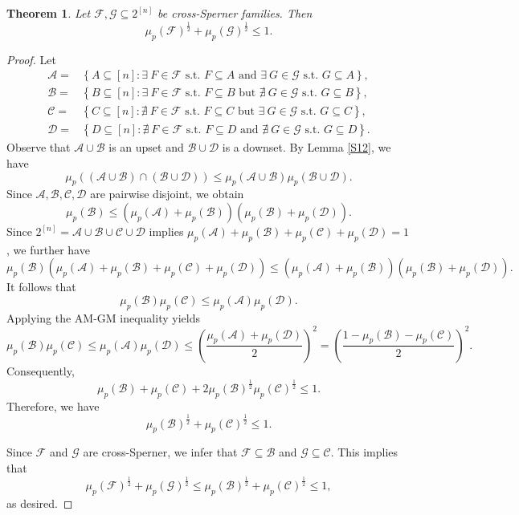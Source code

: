 \documentclass[11pt]{article}
\newtheorem{theorem}{Theorem}[section]
\begin{document}
\begin{theorem}\label{t2}
Let $\mathcal{F}, \mathcal{G} \subseteq 2^{[n]}$ be cross-Sperner families. Then 
$$
\mu_p(\mathcal{F})^{\frac{1}{2}}+\mu_p(\mathcal{G})^{\frac{1}{2}}\leq 1.
$$
\end{theorem}
\begin{proof}
Let 
\begin{align*}
\mathcal{A}=&\left\{A\subseteq [n]: \exists~ F\in \mathcal{F} \text{ s.t. } F\subseteq A \text{ and } \exists~ G\in \mathcal{G} \text{ s.t. } G\subseteq A\right\},\\
\mathcal{B}=&\left\{B\subseteq [n]: \exists~ F\in \mathcal{F} \text{ s.t. } F\subseteq B \text{ but } \nexists~ G\in \mathcal{G} \text{ s.t. } G\subseteq B \right\},\\
\mathcal{C}=&\left\{C\subseteq [n]: \nexists~ F\in \mathcal{F} \text{ s.t. } F\subseteq C \text{ but } \exists~ G\in \mathcal{G} \text{ s.t. } G\subseteq C \right\},\\
\mathcal{D}=&\left\{D\subseteq [n]: \nexists~ F\in \mathcal{F} \text{ s.t. } F\subseteq D \text{ and } \nexists~ G\in \mathcal{G} \text{ s.t. } G\subseteq D \right\}.
\end{align*}
Observe that $\mathcal{A}\cup \mathcal{B}$ is an upset and $\mathcal{B}\cup \mathcal{D}$ is a downset.
By Lemma \ref{S12}, we have 
$$
\mu_p((\mathcal{A}\cup \mathcal{B})\cap (\mathcal{B}\cup \mathcal{D}))\leq\mu_p(\mathcal{A}\cup \mathcal{B})\mu_p(\mathcal{B}\cup \mathcal{D}).
$$
Since $\mathcal{A}, \mathcal{B},\mathcal{C},\mathcal{D}$
are pairwise disjoint, we obtain
$$
\mu_p(\mathcal{B})\leq\left(\mu_p(\mathcal{A})+\mu_p(\mathcal{B})\right)\left(\mu_p(\mathcal{B})+\mu_p(\mathcal{D})\right).
$$
Since $2^{[n]}=\mathcal{A}\cup \mathcal{B}\cup \mathcal{C}\cup \mathcal{D}$ implies $\mu_p(\mathcal{A})+\mu_p(\mathcal{B})+\mu_p(\mathcal{C})+\mu_p(\mathcal{D})=1$, we further have
$$
\mu_p(\mathcal{B})\left( \mu_p(\mathcal{A})+\mu_p(\mathcal{B})+\mu_p(\mathcal{C})+\mu_p(\mathcal{D})\right)\leq\left(\mu_p(\mathcal{A})+\mu_p(\mathcal{B})\right)\left(\mu_p(\mathcal{B})+\mu_p(\mathcal{D})\right).
$$
It follows that
$$
\mu_p(\mathcal{B})\mu_p(\mathcal{C})\leq\mu_p(\mathcal{A})\mu_p(\mathcal{D}).
$$
Applying the AM-GM inequality yields 
$$
\mu_p(\mathcal{B})\mu_p(\mathcal{C})\leq\mu_p(\mathcal{A})\mu_p(\mathcal{D})\leq \left(\frac{\mu_p(\mathcal{A})+\mu_p(\mathcal{D})}{2}\right)^2=\left(\frac{1-\mu_p(\mathcal{B})-\mu_p(\mathcal{C})}{2}\right)^2.
$$
Consequently, 
$$
\mu_p(\mathcal{B})+\mu_p(\mathcal{C})+2\mu_p(\mathcal{B})^{\frac{1}{2}}\mu_p(\mathcal{C})^{\frac{1}{2}}\leq 1.
$$
Therefore, we have
$$
\mu_p(\mathcal{B})^{\frac{1}{2}}+\mu_p(\mathcal{C})^{\frac{1}{2}}\leq 1.
$$

Since  $\mathcal{F}$ and $\mathcal{G}$ are cross-Sperner, we infer that $\mathcal{F}\subseteq \mathcal{B}$ and $\mathcal{G}\subseteq \mathcal{C}$.
This implies that
$$
\mu_p(\mathcal{F})^{\frac{1}{2}}+\mu_p(\mathcal{G})^{\frac{1}{2}}\leq \mu_p(\mathcal{B})^{\frac{1}{2}}+\mu_p(\mathcal{C})^{\frac{1}{2}}\leq1,
$$
as desired.
\end{proof}
\end{document}

